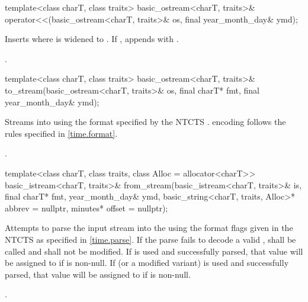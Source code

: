%
\begin{itemdecl}
template<class charT, class traits>
  basic_ostream<charT, traits>&
    operator<<(basic_ostream<charT, traits>& os, final year_month_day& ymd);
\end{itemdecl}

\begin{itemdescr}
\pnum
\effects
Inserts 
where  is  widened to .
If , appends with .

\pnum
\returns {}.
\end{itemdescr}

%
\begin{itemdecl}
template<class charT, class traits>
  basic_ostream<charT, traits>&
    to_stream(basic_ostream<charT, traits>& os, final charT* fmt, final year_month_day& ymd);
\end{itemdecl}

\begin{itemdescr}
\pnum
\effects
Streams  into  using
the format specified by the NTCTS .
 encoding follows the rules specified in \ref{time.format}.

\pnum
\returns {}.
\end{itemdescr}

%
\begin{itemdecl}
template<class charT, class traits, class Alloc = allocator<charT>>
  basic_istream<charT, traits>&
    from_stream(basic_istream<charT, traits>& is, final charT* fmt,
                year_month_day& ymd, basic_string<charT, traits, Alloc>* abbrev = nullptr,
                minutes* offset = nullptr);
\end{itemdecl}

\begin{itemdescr}
\pnum
\effects
Attempts to parse the input stream 
into the   using
the format flags given in the NTCTS 
as specified in \ref{time.parse}.
If the parse fails to decode a valid ,
 shall be called
and  shall not be modified.
If  is used and successfully parsed,
that value will be assigned to  if  is non-null.
If  (or a modified variant) is used and successfully parsed,
that value will be assigned to  if  is non-null.

\pnum
\returns {}.
\end{itemdescr}

